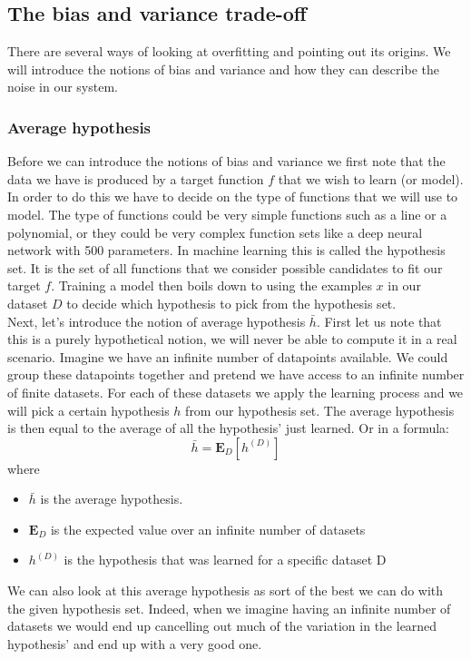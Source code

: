 \subsection{The bias and variance trade-off}
There are several ways of looking at overfitting and pointing out its origins. We will introduce the notions of bias and variance and how they can describe the noise in our system. \\
\subsubsection{Average hypothesis}
Before we can introduce the notions of bias and variance we first note that the data we have is produced by a target function $f$ that we wish to learn (or model). In order to do this we have to decide on the type of functions that we will use to model. The type of functions could be very simple functions such as a line or a polynomial, or they could be very complex function sets like a deep neural network with 500 parameters. In machine learning this is called the hypothesis set. It is the set of all functions that we consider possible candidates to fit our target $f$. Training a model then boils down to using the examples $x$ in our dataset $D$ to decide which hypothesis to pick from the hypothesis set. \\
Next, let's introduce the notion of average hypothesis $\bar{h}$. First let us note that this is a purely hypothetical notion, we will never be able to compute it in a real scenario. Imagine we have an infinite number of datapoints available. We could group these datapoints together and pretend we have access to an infinite number of finite datasets. For each of these datasets we apply the learning process and we will pick a certain hypothesis $h$ from our hypothesis set. The average hypothesis is then equal to the average of all the hypothesis' just learned. Or in a formula:
$$
\bar{h} = \mathbf{E}_{D}[h^{(D)}]
$$
where
\begin{itemize}
	\item $\bar{h}$ is the average hypothesis.
	\item $\mathbf{E}_{D}$ is the expected value over an infinite number of datasets
	\item $h^{(D)}$ is the hypothesis that was learned for a specific dataset D
\end{itemize}
We can also look at this average hypothesis as sort of the best we can do with the given hypothesis set. Indeed, when we imagine having an infinite number of datasets we would end up cancelling out much of the variation in the learned hypothesis' and end up with a very good one. \\
